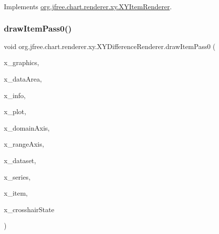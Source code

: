 Implements \mbox{\hyperlink{interfaceorg_1_1jfree_1_1chart_1_1renderer_1_1xy_1_1_x_y_item_renderer_ad867040a3ea09f5127596aacdd94586a}{org.\+jfree.\+chart.\+renderer.\+xy.\+X\+Y\+Item\+Renderer}}.

\mbox{\label{classorg_1_1jfree_1_1chart_1_1renderer_1_1xy_1_1_x_y_difference_renderer_adc855c55f962a468d7b18740e7d80419}} 
\subsubsection{\texorpdfstring{draw\+Item\+Pass0()}{drawItemPass0()}}
{\footnotesize\ttfamily void org.\+jfree.\+chart.\+renderer.\+xy.\+X\+Y\+Difference\+Renderer.\+draw\+Item\+Pass0 (\begin{DoxyParamCaption}\item[{Graphics2D}]{x\+\_\+graphics,  }\item[{Rectangle2D}]{x\+\_\+data\+Area,  }\item[{\mbox{\hyperlink{classorg_1_1jfree_1_1chart_1_1plot_1_1_plot_rendering_info}{Plot\+Rendering\+Info}}}]{x\+\_\+info,  }\item[{\mbox{\hyperlink{classorg_1_1jfree_1_1chart_1_1plot_1_1_x_y_plot}{X\+Y\+Plot}}}]{x\+\_\+plot,  }\item[{\mbox{\hyperlink{classorg_1_1jfree_1_1chart_1_1axis_1_1_value_axis}{Value\+Axis}}}]{x\+\_\+domain\+Axis,  }\item[{\mbox{\hyperlink{classorg_1_1jfree_1_1chart_1_1axis_1_1_value_axis}{Value\+Axis}}}]{x\+\_\+range\+Axis,  }\item[{\mbox{\hyperlink{interfaceorg_1_1jfree_1_1data_1_1xy_1_1_x_y_dataset}{X\+Y\+Dataset}}}]{x\+\_\+dataset,  }\item[{int}]{x\+\_\+series,  }\item[{int}]{x\+\_\+item,  }\item[{\mbox{\hyperlink{classorg_1_1jfree_1_1chart_1_1plot_1_1_crosshair_state}{Crosshair\+State}}}]{x\+\_\+crosshair\+State }\end{DoxyParamCaption})\hspace{0.3cm}{\ttfamily [protected]}}

